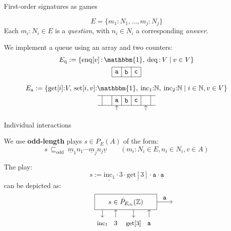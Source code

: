 \documentclass{beamer}
\newcommand{\kw}[1]{\ensuremath{ \mathrm{#1} }}
\newcommand{\deqpic}[3]{%
  \begin{tikzpicture}[scale=0.4]
    \draw (-4,-1) rectangle (4,1);
    \node (x) at (0,0) {$#1$};
    \draw[->] (-3, -1) -- (-3, -2);
    \node[anchor=base] at (-3, -3) {\small $\kw{inc}_1$};
    \draw[<-] (-1.3, -1) -- (-1.3, -2);
    \node[anchor=base] at (-1.3, -3) {$#2$};
    \draw[->] (1, -1) -- (1, -2);
    \node[anchor=base] at (1, -3) {\small $\kw{get}[#2]$};
    \draw[<-] (3, -1) -- (3, -2);
    \node[anchor=base] at (3, -3) {$#3$};
    \draw[->] (4,0) -- node[above] {$#3$} (6,0);
  \end{tikzpicture}%
}
\begin{document}
\begin{frame}{First-order signatures as games} %
  \begin{definition}[Signature]
  \[
    E = \{ m_1 : N_1, \ldots, m_j : N_j \}
  \]
  Each $m_i : N_i \in E$ is a \emph{question},
  with $n_i \in N_i$ a corresponding \emph{answer}.
  \end{definition}
  \pause
  \begin{example}
    We implement a queue using an array and two counters:
    \begin{gather*}
      E_\kw{q} := \{
        \kw{enq}[v] \mathop{:} \mathbbm{1}, \:
        \kw{deq} \mathop{:} V \mid
        v \in V \}
      \\
      \begin{tikzpicture}[scale=0.5]
        \draw (0,0) grid (3,1);
        \node at (0.5,0.5) {$\mathtt{a}$};
        \node at (1.5,0.5) {$\mathtt{b}$};
        \node at (2.5,0.5) {$\mathtt{c}$};
      \end{tikzpicture}
      \\[1ex]
      E_\kw{a} := \{
        \kw{get}[i] {:} V, \:
        \kw{set}[i,v] {:} \mathbbm{1}, \:
        \kw{inc}_1 {:} \mathbb{N}, \:
        \kw{inc}_2 {:} \mathbb{N}
        \mid i \in \mathbb{N}, v \in V \} \\
      \begin{tikzpicture}[scale=0.5]
        \draw (-0.5,0) grid (5.5,1);
        \node at (1.5,0.5) {$\mathtt{a}$};
        \node at (2.5,0.5) {$\mathtt{b}$};
        \node at (3.5,0.5) {$\mathtt{c}$};
        \draw[->] (1.5,-0.5) -- (1.5,0);
        \draw[->] (4.5,-0.5) -- (4.5,0);
      \end{tikzpicture}
    \end{gather*}
  \end{example}
\end{frame}

\begin{frame}{Individual interactions} %
\begin{definition}[Plays]
We use \textbf{odd-length} plays $s \in P_E(A)$ of the form:
\[
  s \: \sqsubseteq_\kw{odd} \:
    \underline{m}_1 n_1
    \cdots
    \underline{m}_j n_j
    \underline{v}
  \qquad
  (m_i : N_i \in E, n_i \in N_i, v \in A)
\]
\end{definition}
\pause
\begin{example}
  The play:
  \[
    s :=
    \underline{\kw{inc}_1} \cdot 3 \cdot
    \underline{\kw{get}[3]} \cdot \mathtt{a} \cdot
    \underline{\mathtt{a}}
  \]
  can be depicted as:
  \[
    \qquad
    \deqpic{s \in \bar{P}_{E_\kw{rb}}(\mathbb{Z})}{3}{\mathtt{a}}
  \]
\end{example}
\end{frame}
\end{document}

